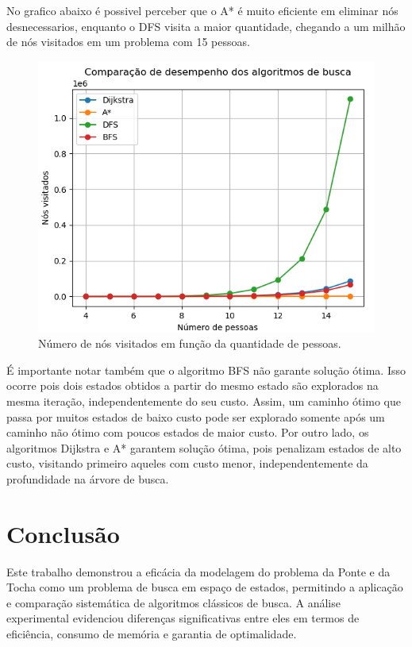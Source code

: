 \documentclass[12pt,a4paper]{article}
\begin{document}
No grafico abaixo é possivel perceber que o A* é muito eficiente em eliminar nós desnecessarios, enquanto o DFS visita a maior quantidade, chegando a um milhão de nós visitados em um problema com 15 pessoas.

\begin{figure}[H]
    \centering
    \includegraphics[width=0.8\linewidth]{node_visited.png}
    \caption{Número de nós visitados em função da quantidade de pessoas.}
    \label{fig:node_visited}
\end{figure}

É importante notar também que o algoritmo BFS não garante solução ótima. Isso ocorre pois dois estados obtidos a partir do mesmo estado são explorados na mesma iteração, independentemente do seu custo. Assim, um caminho ótimo que passa por muitos estados de baixo custo pode ser explorado somente após um caminho não ótimo com poucos estados de maior custo.  
Por outro lado, os algoritmos Dijkstra e A* garantem solução ótima, pois penalizam estados de alto custo, visitando primeiro aqueles com custo menor, independentemente da profundidade na árvore de busca.

\section{Conclusão}

Este trabalho demonstrou a eficácia da modelagem do problema da Ponte e da Tocha como um problema de busca em espaço de estados, permitindo a aplicação e comparação sistemática de algoritmos clássicos de busca. A análise experimental evidenciou diferenças significativas entre eles em termos de eficiência, consumo de memória e garantia de optimalidade.  
\end{document}

